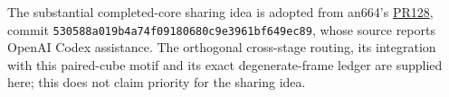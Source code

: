 The substantial completed-core sharing idea is adopted from an664's
\href{https://github.com/CrocSwap/integer-mult-bounds/pull/128}{PR128},
commit \texttt{530588a019b4a74f09180680c9e3961bf649ec89}, whose source
reports OpenAI Codex assistance. The orthogonal cross-stage routing,
its integration with this paired-cube motif and its exact degenerate-frame
ledger are supplied here; this does not claim priority for the sharing idea.
